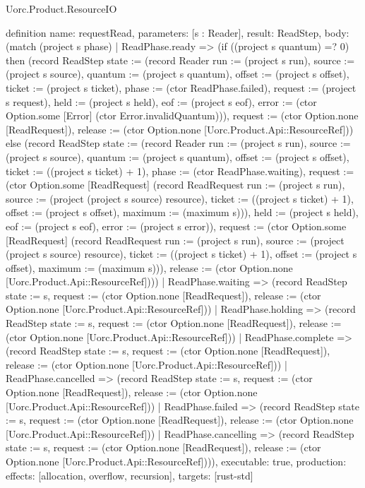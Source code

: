 \begin{lexlean}{Uorc.Product.ResourceIO}
\begin{semanticmodule}
definition{
  name: requestRead,
  parameters: [s : Reader],
  result: ReadStep,
  body: (match (project s phase)
    | ReadPhase.ready => (if ((project s quantum) =? 0) then (record ReadStep {state := (record Reader {run := (project s run), source := (project s source), quantum := (project s quantum), offset := (project s offset), ticket := (project s ticket), phase := (ctor ReadPhase.failed), request := (project s request), held := (project s held), eof := (project s eof), error := (ctor Option.some [Error] (ctor Error.invalidQuantum))}), request := (ctor Option.none [ReadRequest]), release := (ctor Option.none [Uorc.Product.Api::ResourceRef])}) else (record ReadStep {state := (record Reader {run := (project s run), source := (project s source), quantum := (project s quantum), offset := (project s offset), ticket := ((project s ticket) + 1), phase := (ctor ReadPhase.waiting), request := (ctor Option.some [ReadRequest] (record ReadRequest {run := (project s run), source := (project (project s source) resource), ticket := ((project s ticket) + 1), offset := (project s offset), maximum := (maximum s)})), held := (project s held), eof := (project s eof), error := (project s error)}), request := (ctor Option.some [ReadRequest] (record ReadRequest {run := (project s run), source := (project (project s source) resource), ticket := ((project s ticket) + 1), offset := (project s offset), maximum := (maximum s)})), release := (ctor Option.none [Uorc.Product.Api::ResourceRef])}))
    | ReadPhase.waiting => (record ReadStep {state := s, request := (ctor Option.none [ReadRequest]), release := (ctor Option.none [Uorc.Product.Api::ResourceRef])})
    | ReadPhase.holding => (record ReadStep {state := s, request := (ctor Option.none [ReadRequest]), release := (ctor Option.none [Uorc.Product.Api::ResourceRef])})
    | ReadPhase.complete => (record ReadStep {state := s, request := (ctor Option.none [ReadRequest]), release := (ctor Option.none [Uorc.Product.Api::ResourceRef])})
    | ReadPhase.cancelled => (record ReadStep {state := s, request := (ctor Option.none [ReadRequest]), release := (ctor Option.none [Uorc.Product.Api::ResourceRef])})
    | ReadPhase.failed => (record ReadStep {state := s, request := (ctor Option.none [ReadRequest]), release := (ctor Option.none [Uorc.Product.Api::ResourceRef])})
    | ReadPhase.cancelling => (record ReadStep {state := s, request := (ctor Option.none [ReadRequest]), release := (ctor Option.none [Uorc.Product.Api::ResourceRef])})),
  executable: true,
  production: {effects: [allocation, overflow, recursion], targets: [rust-std]}
}


\end{semanticmodule}
\end{lexlean}
